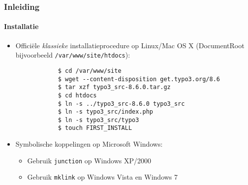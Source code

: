 \begin{frame}[fragile]
	\frametitle{Inleiding}
	\framesubtitle{Installatie}

	\begin{itemize}
		\item Officiële \textit{klassieke} installatieprocedure op Linux/Mac OS X\newline
			(DocumentRoot bijvoorbeeld \texttt{/var/www/site/htdocs}):
		\begin{lstlisting}
			$ cd /var/www/site
			$ wget --content-disposition get.typo3.org/8.6
			$ tar xzf typo3_src-8.6.0.tar.gz
			$ cd htdocs
			$ ln -s ../typo3_src-8.6.0 typo3_src
			$ ln -s typo3_src/index.php
			$ ln -s typo3_src/typo3
			$ touch FIRST_INSTALL
		\end{lstlisting}

		\item Symbolische koppelingen op Microsoft Windows:

			\begin{itemize}
				\item Gebruik \texttt{junction} op Windows XP/2000
				\item Gebruik \texttt{mklink} op Windows Vista en Windows 7
			\end{itemize}

	\end{itemize}
\end{frame}

